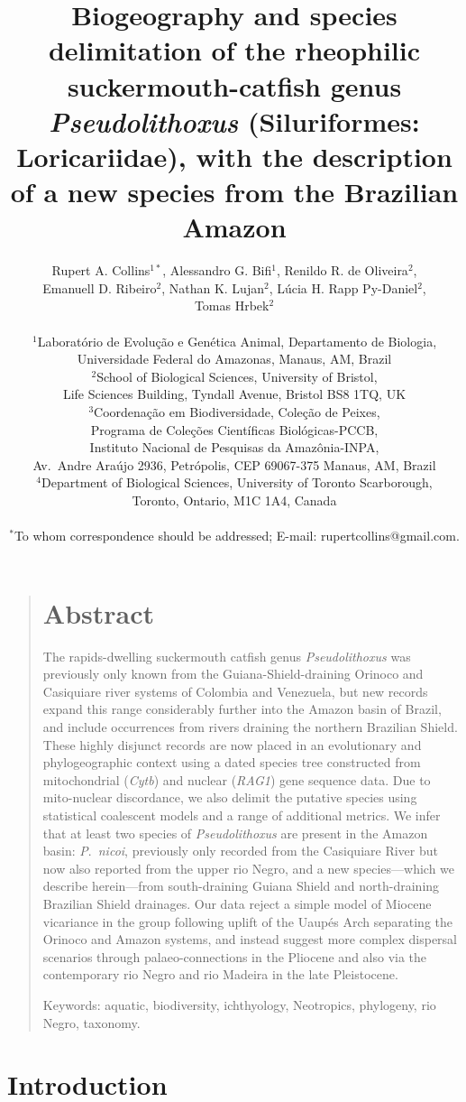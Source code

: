 \documentclass[12pt]{article}
\title{Biogeography and species delimitation of the rheophilic suckermouth-catfish genus \emph{Pseudolithoxus} (Siluriformes: Loricariidae), with the description of a new species from the Brazilian Amazon}
\author
{Rupert A. Collins$^{1\ast}$, Alessandro G. Bifi$^{1}$,  Renildo R. de Oliveira$^{2}$,\\ Emanuell D. Ribeiro$^{2}$, Nathan K. Lujan$^{2}$, Lúcia H. Rapp Py-Daniel$^{2}$,\\ Tomas Hrbek$^{2}$ \\
\\
\small{$^{1}$Laboratório de Evolução e Genética Animal, Departamento de Biologia,}\\
\small{Universidade Federal do Amazonas, Manaus, AM, Brazil}\\
\small{$^{2}$School of Biological Sciences, University of Bristol,}\\
\small{Life Sciences Building, Tyndall Avenue, Bristol BS8 1TQ, UK}\\
\small{$^{3}$Coordenação em Biodiversidade, Coleção de Peixes,}\\
\small{Programa de Coleções Científicas Biológicas-PCCB,}\\
\small{Instituto Nacional de Pesquisas da Amazônia-INPA,}\\
\small{Av.\ Andre Araújo 2936, Petrópolis, CEP 69067-375 Manaus, AM, Brazil}\\
\small{$^{4}$Department of Biological Sciences, University of Toronto Scarborough,}\\
\small{Toronto, Ontario, M1C 1A4, Canada}\\
\\
\normalsize{$^\ast$To whom correspondence should be addressed; E-mail:  rupertcollins@gmail.com.}
}
\date{}
\newenvironment{sciabstract}{%
\begin{quote} \bf}
{\end{quote}}
\begin{document}
 

\baselineskip24pt

\maketitle 
\newpage

\begin{sciabstract}
\section*{Abstract}
The rapids-dwelling suckermouth catfish genus \emph{Pseudolithoxus} was previously only known from the Guiana-Shield-draining Orinoco and Casiquiare river systems of Colombia and Venezuela, but new records expand this range considerably further into the Amazon basin of Brazil, and include occurrences from rivers draining the northern Brazilian Shield. %
These highly disjunct records are now placed in an evolutionary and phylogeographic context using a dated species tree constructed from mitochondrial (\emph{Cytb}) and nuclear (\emph{RAG1}) gene sequence data. %
Due to mito-nuclear discordance, we also delimit the putative species using statistical coalescent models and a range of additional metrics. %
We infer that at least two species of \emph{Pseudolithoxus} are present in the Amazon basin: \emph{P}.\ \emph{nicoi}, previously only recorded from the Casiquiare River but now also reported from the upper rio Negro, and a new species---which we describe herein---from south-draining Guiana Shield and north-draining Brazilian Shield drainages. %
Our data reject a simple model of Miocene vicariance in the group following uplift of the Uaupés Arch separating the Orinoco and Amazon systems, and instead suggest more complex dispersal scenarios through palaeo-connections in the Pliocene and also via the contemporary rio Negro and rio Madeira in the late Pleistocene.%

\bigskip
Keywords: aquatic, biodiversity, ichthyology, Neotropics, phylogeny, rio Negro, taxonomy.
\end{sciabstract}

\newpage
\section*{Introduction}
\end{document}
